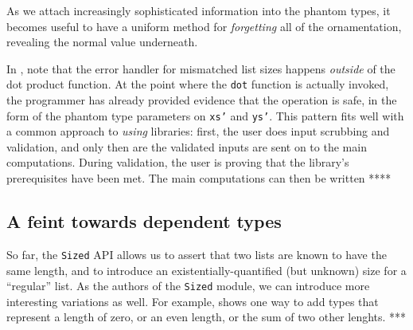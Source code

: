 \documentclass[format=sigplan, review=false, screen=true]{acmart}
\begin{document}
As we attach increasingly sophisticated information into the phantom types, it becomes useful to
have a uniform method for \emph{forgetting} all of the ornamentation, revealing the normal
value underneath.

In , note that the error handler for mismatched list sizes happens
\emph{outside} of the dot product function. At the point where the \texttt{dot} function
is actually invoked, the programmer has already provided evidence that the operation is
safe, in the form of the phantom type parameters on \texttt{xs'} and \texttt{ys'}. This pattern
fits well with a common approach to \emph{using} libraries: first, the user does input scrubbing
and validation, and only then are the validated inputs are sent on to the main computations. 
During validation, the user is proving that the library's prerequisites have been met. The
main computations can then be written **** 

\subsection{A feint towards dependent types}
So far, the \texttt{Sized} API allows us to assert that two lists are known to have the same
length, and to introduce an existentially-quantified (but unknown) size for a ``regular'' list.
As the authors of the \texttt{Sized} module, we can introduce more interesting variations as
well. For example,  shows one way to add types that represent a length of
zero, or an even length, or the sum of two other lenghts. ***
\end{document}
